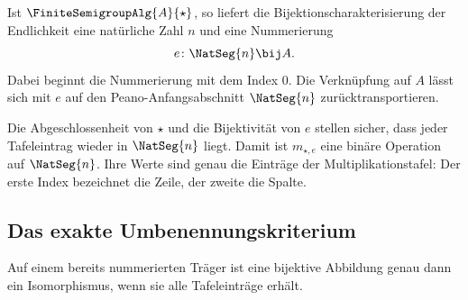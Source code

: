 \documentclass[main.tex]{subfiles}
\begin{document}
Ist \(\FiniteSemigroupAlg{A}{\star}\), so liefert die
Bijektionscharakterisierung der Endlichkeit eine natürliche Zahl \(n\) und
eine Nummerierung
\[
  e\colon\NatSeg{n}\bij A.
\]
Dabei beginnt die Nummerierung mit dem Index \(0\).  Die Verknüpfung auf
\(A\) lässt sich mit \(e\) auf den Peano-Anfangsabschnitt
\(\NatSeg{n}\) zurücktransportieren.


Die Abgeschlossenheit von \(\star\) und die Bijektivität von \(e\)
stellen sicher, dass jeder Tafeleintrag wieder in \(\NatSeg{n}\) liegt.
Damit ist \(m_{\star,e}\) eine binäre Operation auf
\(\NatSeg{n}\).  Ihre Werte sind genau die Einträge der
Multiplikationstafel: Der erste Index bezeichnet die Zeile, der zweite die
Spalte.

\subsection{Das exakte Umbenennungskriterium}

Auf einem bereits nummerierten Träger ist eine bijektive Abbildung genau
dann ein Isomorphismus, wenn sie alle Tafeleinträge erhält.
\end{document}
